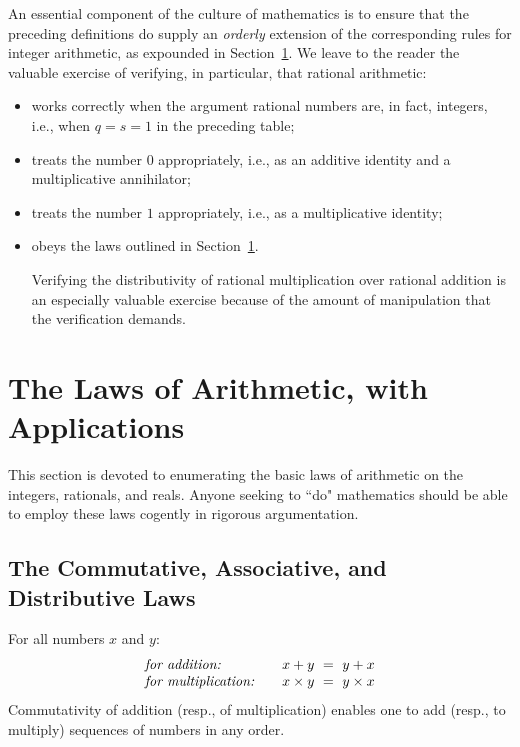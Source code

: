 An essential component of the culture of mathematics is to ensure that the preceding definitions do supply an {\em orderly} extension of the corresponding rules for integer arithmetic, as expounded in Section~\ref{sec:Arithmetic-Laws}.  We leave to the reader the valuable exercise of verifying, in particular, that rational arithmetic:
\begin{itemize}
\item
works correctly when the argument rational numbers are, in fact, integers, i.e., when $q = s = 1$ in the preceding table;
\medskip\item
treats the number $0$ appropriately, i.e., as an additive identity and a multiplicative annihilator;
\medskip\item
treats the number $1$ appropriately, i.e., as a multiplicative identity;
\medskip\item
obeys the laws outlined in Section~\ref{sec:Arithmetic-Laws}.

\smallskip

Verifying the distributivity of rational multiplication over rational addition is an especially valuable exercise because of the amount of manipulation that the verification demands.
\end{itemize}


\section{The Laws of Arithmetic, with Applications}
\label{sec:Arithmetic-Laws}

This section is devoted to enumerating the basic laws of arithmetic on the integers, rationals, and reals.  Anyone seeking to ``do" mathematics should be able to employ these laws cogently in rigorous argumentation.

\subsection{The Commutative, Associative, and Distributive Laws} 

 
 

For all numbers $x$ and $y$:
\[
\begin{array}{llc}
\mbox{\it for addition:}
  & & x+y \ = \ y+x  \index{commutativity of addition} \\
\mbox{\it for multiplication:}
  & & x \times y \ = \ y \times x \index{commutativity of multiplication}
\end{array}
\]
Commutativity of addition (resp., of multiplication) enables one to add (resp., to multiply) sequences of numbers in any order. 

